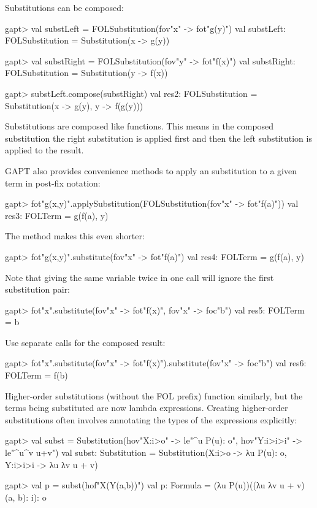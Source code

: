 \documentclass[a4paper,11pt]{book}
\newcommand{\cli}[1]{{\ttfamily {#1}}}
\begin{document}
Substitutions can be composed:
\begin{clilisting}
gapt> val substLeft = FOLSubstitution(fov"x" -> fot"g(y)")
val substLeft: FOLSubstitution = Substitution(x -> g(y))

gapt> val substRight = FOLSubstitution(fov"y" -> fot"f(x)")
val substRight: FOLSubstitution = Substitution(y -> f(x))

gapt> substLeft.compose(substRight)
val res2: FOLSubstitution = Substitution(x -> g(y), y -> f(g(y)))

\end{clilisting}

Substitutions are composed like functions. This means in the composed substitution the right substitution is applied first and then the left substitution is applied to the result.

GAPT also provides convenience methods to apply an substitution to a given term in post-fix notation:
\begin{clilisting}
gapt> fot"g(x,y)".applySubstitution(FOLSubstitution(fov"x" -> fot"f(a)"))
val res3: FOLTerm = g(f(a), y)

\end{clilisting}

The \cli{substitute} method makes this even shorter:
\begin{clilisting}
gapt> fot"g(x,y)".substitute(fov"x" -> fot"f(a)")
val res4: FOLTerm = g(f(a), y)

\end{clilisting}

Note that giving the same variable twice in one \cli{substitute} call will ignore the first substitution pair:
\begin{clilisting}
gapt> fot"x".substitute(fov"x" -> fot"f(x)", fov"x" -> foc"b")
val res5: FOLTerm = b

\end{clilisting}

Use separate \cli{subsitute} calls for the composed result:
\begin{clilisting}
gapt> fot"x".substitute(fov"x" -> fot"f(x)").substitute(fov"x" -> foc"b")
val res6: FOLTerm = f(b)

\end{clilisting}

Higher-order substitutions (without the FOL prefix) function similarly, but the terms being substituted are now lambda expressions. Creating higher-order substitutions often involves annotating the types of the expressions explicitly:
\begin{clilisting}
gapt> val subst = Substitution(hov"X:i>o" -> le"^u P(u): o", hov"Y:i>i>i" -> le"^u^v u+v")
val subst: Substitution = Substitution(X:i>o -> λu P(u): o, Y:i>i>i -> λu λv u + v)

gapt> val p = subst(hof"X(Y(a,b))")
val p: Formula = (λu P(u))((λu λv u + v)(a, b): i): o

\end{clilisting}
\end{document}
